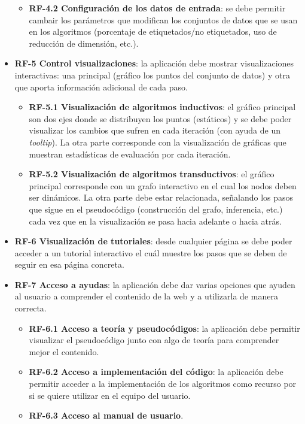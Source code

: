 \begin{itemize}
\begin{itemize}
		\item \textbf{RF-4.2 Configuración de los datos de entrada}: se debe permitir cambair los parámetros que modifican los conjuntos de datos que se usan en los algoritmos (porcentaje de etiquetados/no etiquetados, uso de reducción de dimensión, etc.).
	\end{itemize} 
	\item \textbf{RF-5 Control visualizaciones}: la aplicación debe mostrar visualizaciones interactivas: una principal (gráfico los puntos del conjunto de datos) y otra que aporta información adicional de cada paso.
	\begin{itemize}
		\item \textbf{RF-5.1 Visualización de algoritmos inductivos}: el gráfico principal son dos ejes donde se distribuyen los puntos (estáticos) y se debe poder visualizar los cambios que sufren en cada iteración (con ayuda de un \textit{tooltip}). La otra parte corresponde con la visualización de gráficas que muestran estadísticas de evaluación por cada iteración.
		\item \textbf{RF-5.2 Visualización de algoritmos transductivos}: el gráfico principal corresponde con un grafo interactivo en el cual los nodos deben ser dinámicos. La otra parte debe estar relacionada, señalando los pasos que sigue en el pseudocódigo (construcción del grafo, inferencia, etc.) cada vez que en la visualización se pasa hacia adelante o hacia atrás.
	\end{itemize}
	\item \textbf{RF-6 Visualización de tutoriales}: desde cualquier página se debe poder acceder a un tutorial interactivo el cuál muestre los pasos que se deben de seguir en esa página concreta.
	\item \textbf{RF-7 Acceso a ayudas}: la aplicación debe dar varias opciones que ayuden al usuario a comprender el contenido de la web y a utilizarla de manera correcta.
	\begin{itemize}
		\item \textbf{RF-6.1 Acceso a teoría y pseudocódigos}: la aplicación debe permitir visualizar el pseudocódigo junto con algo de teoría para comprender mejor el contenido.
		\item \textbf{RF-6.2 Acceso a implementación del código}: la aplicación debe permitir acceder a la implementación de los algoritmos como recurso por si se quiere utilizar en el equipo del usuario.
		\item \textbf{RF-6.3 Acceso al manual de usuario}.
	\end{itemize}
\end{itemize}

